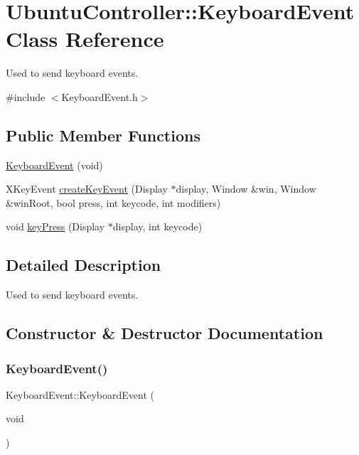 \hypertarget{classUbuntuController_1_1KeyboardEvent}{}\section{Ubuntu\+Controller\+:\+:Keyboard\+Event Class Reference}
\label{classUbuntuController_1_1KeyboardEvent}


Used to send keyboard events.  




{\ttfamily \#include $<$Keyboard\+Event.\+h$>$}

\subsection*{Public Member Functions}
\begin{DoxyCompactItemize}
\item 
\hyperlink{classUbuntuController_1_1KeyboardEvent_a5a4efca276ce847a471b228c4a114bc7}{Keyboard\+Event} (void)
\item 
X\+Key\+Event \hyperlink{classUbuntuController_1_1KeyboardEvent_a84e25f7a086a015007fe877a55d9444e}{create\+Key\+Event} (Display $\ast$display, Window \&win, Window \&win\+Root, bool press, int keycode, int modifiers)
\item 
void \hyperlink{classUbuntuController_1_1KeyboardEvent_aea537f2a22fc1f162fd81b5d039eb053}{key\+Press} (Display $\ast$display, int keycode)
\end{DoxyCompactItemize}


\subsection{Detailed Description}
Used to send keyboard events. 

\subsection{Constructor \& Destructor Documentation}
\mbox{\label{classUbuntuController_1_1KeyboardEvent_a5a4efca276ce847a471b228c4a114bc7}} 
\subsubsection{\texorpdfstring{Keyboard\+Event()}{KeyboardEvent()}}
{\footnotesize\ttfamily Keyboard\+Event\+::\+Keyboard\+Event (\begin{DoxyParamCaption}\item[{void}]{ }\end{DoxyParamCaption})}



